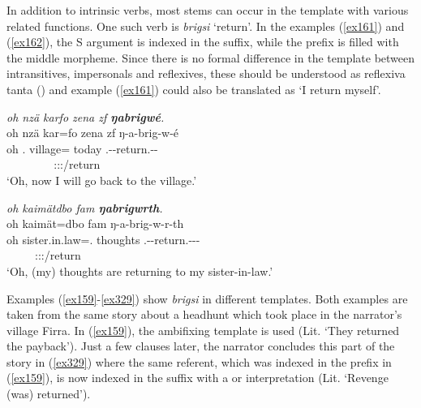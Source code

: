 In addition to intrinsic  verbs, most  stems can occur in the  template with various related functions. One such verb is \emph{brigsi} `return'. In the examples (\ref{ex161}) and (\ref{ex162}), the S argument is indexed in the suffix, while the prefix is filled with the middle morpheme. Since there is no formal difference in the  template between intransitives, impersonals and reflexives, these should be understood as reflexiva tanta (\citealt{Geniusienie:1987refl}) and example (\ref{ex161}) could also be translated as `I return myself'.

\begin{exe}
	\ex \emph{oh nzä karfo zena zf \textbf{ŋabrigwé}.}\\
	\glll oh nzä kar=fo zena zf ŋ-a-brig-w-é\\
	oh \Fsg.\Abs{} village=\All{} today \Imm{} \M.\Alph-\Vc-return.\Ext-\Ndu-\Fsg\\
	~ ~ ~ ~ ~ {\Fsg:\Sbj:\Nonpast:\Ipfv/return}\\
	\trans `Oh, now I will go back to the village.' 
	\label{ex161}
\end{exe}
\begin{exe}
	\ex \emph{oh kaimätdbo fam \textbf{ŋabrigwrth}.}\\
	\glll oh kaimät=dbo fam ŋ-a-brig-w-r-th\\
	oh sister.in.law=\All.\Anim{} thoughts \M.\Alph-\Vc-return.\Ext-\Ndu-\Lk-\Stnsg\\
	~ ~ ~ {\Stpl:\Sbj:\Nonpast:\Ipfv/return}\\
	\trans `Oh, (my) thoughts are returning to my sister-in-law.' 
	\label{ex162}
\end{exe}

Examples (\ref{ex159}-\ref{ex329}) show \emph{brigsi} in different templates. Both examples are taken from the same story about a headhunt which took place in the narrator's village Firra. In (\ref{ex159}), the ambifixing  template is used (Lit. `They returned the payback'). Just a few clauses later, the narrator concludes this part of the story in (\ref{ex329}) where the same referent, which was indexed in the prefix in (\ref{ex159}), is now indexed in the suffix with a  or  interpretation (Lit. `Revenge (was) returned').

